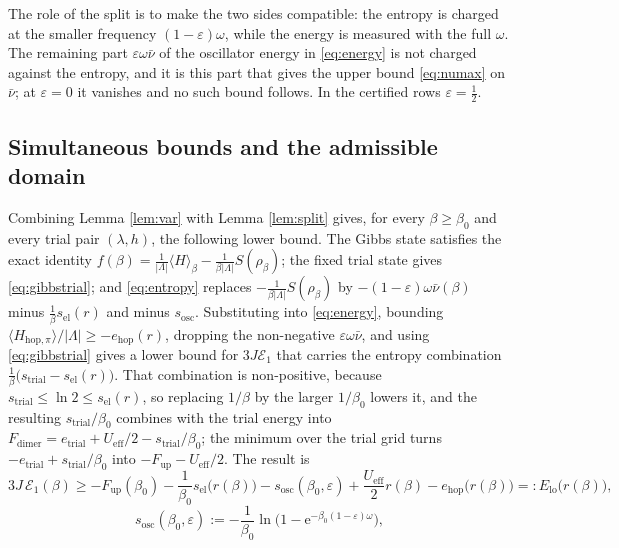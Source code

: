 \documentclass[11pt]{article}
\numberwithin{equation}{section}
\newcommand{\e}{\mathrm{e}}
\newcommand{\Lamb}{\Lambda}
\newcommand{\eff}{\mathrm{eff}}
\newcommand{\hop}{\mathrm{hop}}
\theoremstyle{definition}
\begin{document}
The role of the split is to make the two sides compatible: the entropy is charged at the
smaller frequency $(1-\varepsilon)\omega$, while the energy is measured with the full
$\omega$. The remaining part $\varepsilon\omega\bar\nu$ of the oscillator energy in
\eqref{eq:energy} is not charged against the entropy, and it is this part that gives the
upper bound \eqref{eq:numax} on $\bar\nu$; at $\varepsilon=0$ it vanishes and no such bound
follows. In the certified rows
$\varepsilon=\frac12$.

\subsection{Simultaneous bounds and the admissible domain}

Combining Lemma \ref{lem:var} with Lemma \ref{lem:split} gives, for every
$\beta\ge\beta_0$ and every trial pair $(\lambda,h)$, the following lower bound. The
Gibbs state satisfies the exact identity
$f(\beta)=\frac{1}{|\Lamb|}\langle H\rangle_{\beta}-\frac{1}{\beta|\Lamb|}S(\rho_{\beta})$;
the fixed trial state gives \eqref{eq:gibbstrial}; and \eqref{eq:entropy} replaces
$-\frac{1}{\beta|\Lamb|}S(\rho_{\beta})$ by $-(1-\varepsilon)\omega\bar\nu(\beta)$ minus
$\frac{1}{\beta}s_{\mathrm{el}}(r)$ and minus $s_{\mathrm{osc}}$. Substituting into
\eqref{eq:energy}, bounding $\langle H_{\hop,\pi}\rangle/|\Lamb|\ge-e_{\hop}(r)$, dropping
the non-negative $\varepsilon\omega\bar\nu$, and using \eqref{eq:gibbstrial} gives a lower
bound for $3J\mathcal{E}_{1}$ that carries the entropy combination
$\frac{1}{\beta}\big(s_{\mathrm{trial}}-s_{\mathrm{el}}(r)\big)$. That combination is
non-positive, because $s_{\mathrm{trial}}\le\ln2\le s_{\mathrm{el}}(r)$, so replacing
$1/\beta$ by the larger $1/\beta_0$ lowers it, and the resulting
$s_{\mathrm{trial}}/\beta_0$ combines with the trial energy into
$F_{\mathrm{dimer}}=e_{\mathrm{trial}}+U_{\eff}/2-s_{\mathrm{trial}}/\beta_0$; the minimum
over the trial grid turns $-e_{\mathrm{trial}}+s_{\mathrm{trial}}/\beta_0$ into
$-F_{\mathrm{up}}-U_{\eff}/2$. The result is
\begin{equation}
3J\,\mathcal{E}_{1}(\beta)\ge-F_{\mathrm{up}}(\beta_0)-\frac{1}{\beta_0}s_{\mathrm{el}}\big(r(\beta)\big)-s_{\mathrm{osc}}(\beta_0,\varepsilon)
+\frac{U_{\eff}}{2}r(\beta)-e_{\hop}\big(r(\beta)\big)=:E_{\mathrm{lo}}\big(r(\beta)\big),
\label{eq:Elo}
\end{equation}
\begin{equation}
s_{\mathrm{osc}}(\beta_0,\varepsilon):=-\frac{1}{\beta_0}\ln\Big(1-\e^{-\beta_0(1-\varepsilon)\omega}\Big),
\label{eq:sosc}
\end{equation}
\end{document}
